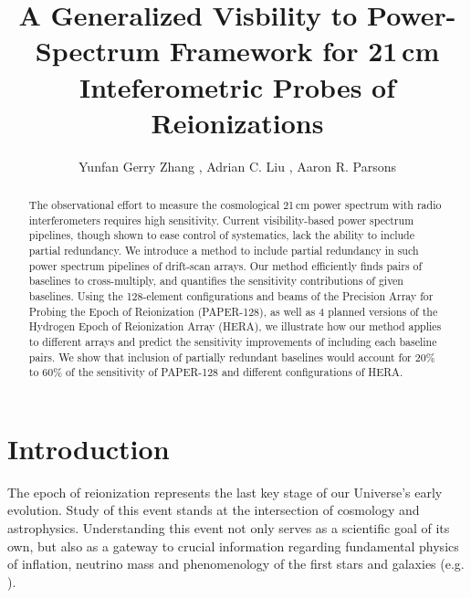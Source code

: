 \documentclass[twocolumn,apj,numberedappendix]{emulateapj}
\renewcommand\[{\begin{equation}}
\renewcommand\]{\end{equation}}
\begin{document}
\title{A Generalized Visbility to Power-Spectrum Framework for 21\,cm Inteferometric Probes of Reionizations}

\author{
Yunfan Gerry Zhang ,
Adrian C. Liu ,
Aaron R. Parsons
}


\begin{abstract}
The observational effort to measure the cosmological 21\,cm power spectrum with radio interferometers requires high sensitivity. Current visibility-based power spectrum pipelines, though shown to ease control of systematics, lack the ability to include partial redundancy. We introduce a method to include partial redundancy in such power spectrum pipelines of drift-scan arrays. Our method efficiently finds pairs of baselines to cross-multiply, and quantifies the sensitivity contributions of given baselines. 
Using the 128-element configurations and beams of the Precision Array for Probing the Epoch of Reionization (PAPER-128), as well as 4 planned versions of the Hydrogen Epoch of Reionization Array (HERA), we illustrate how our method applies to different arrays and predict the sensitivity improvements of including each baseline pairs. We show that inclusion of partially redundant baselines 
would account for $20\%$ to $60\%$ of the sensitivity of PAPER-128 and different configurations of HERA. 
\end{abstract}

\section{Introduction}

The epoch of reionization represents the last key
stage of our Universe's early evolution. Study of this event stands at
the intersection of cosmology and astrophysics. Understanding this
event not only serves as a scientific goal
of its own, but also as a gateway to crucial information
regarding fundamental physics of inflation, neutrino mass and phenomenology
of the first stars and galaxies (e.g. \citealt{LiuOpticalDepth, Liu2016b, Mao2008, DEw21cm, Bull2015, Oyama20131186}). 
\end{document}
